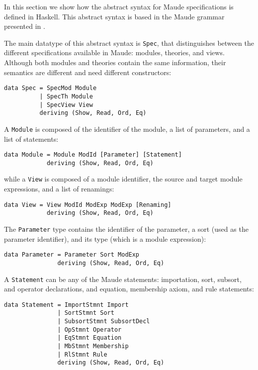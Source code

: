 
In this section we show how the abstract syntax for Maude specifications
is defined in Haskell. This abstract syntax is based in the Maude grammar presented
in \cite[Chapter 24]{maude-book}.

The main datatype of this abstract syntax is \verb"Spec", that
distinguishes between the different specifications available in Maude:
modules, theories, and views. Although both modules and theories contain
the same information, their semantics are different and need different
constructors:

{\codesize
\begin{verbatim}
data Spec = SpecMod Module
          | SpecTh Module
          | SpecView View
          deriving (Show, Read, Ord, Eq)
\end{verbatim}
}

A \verb"Module" is composed of the identifier of the module, a list
of parameters, and a list of statements:

{\codesize
\begin{verbatim}
data Module = Module ModId [Parameter] [Statement]
            deriving (Show, Read, Ord, Eq)
\end{verbatim}
}

\noindent while a \verb"View" is composed of a module identifier, the
source and target module expressions, and a list of renamings:

{\codesize
\begin{verbatim}
data View = View ModId ModExp ModExp [Renaming]
            deriving (Show, Read, Ord, Eq)
\end{verbatim}
}

The \verb"Parameter" type contains the identifier of the parameter,
a sort (used as the parameter identifier), and its type (which is a
module expression):

{\codesize
\begin{verbatim}
data Parameter = Parameter Sort ModExp
               deriving (Show, Read, Ord, Eq)
\end{verbatim}
}

A \verb"Statement" can be any of the Maude statements:
importation, sort, subsort, and operator declarations, and
equation, membership axiom, and rule statements:

{\codesize
\begin{verbatim}
data Statement = ImportStmnt Import
               | SortStmnt Sort
               | SubsortStmnt SubsortDecl
               | OpStmnt Operator
               | EqStmnt Equation
               | MbStmnt Membership
               | RlStmnt Rule
               deriving (Show, Read, Ord, Eq)
\end{verbatim}
}

